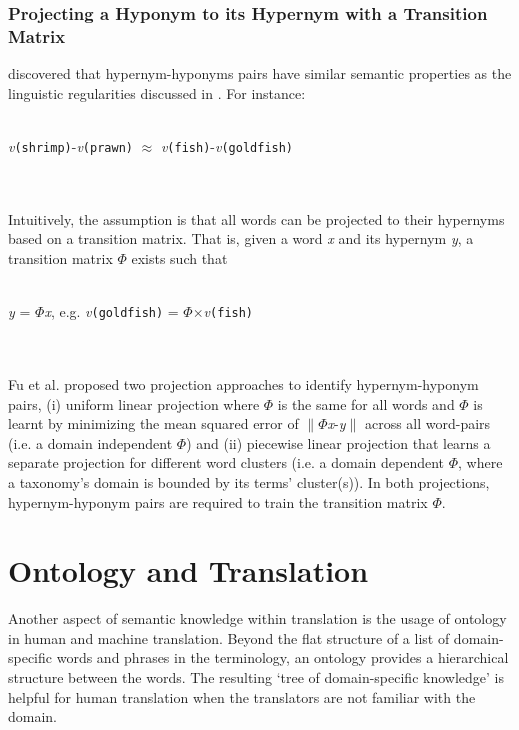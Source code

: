 \subsubsection{Projecting a Hyponym to its Hypernym with a Transition Matrix}
\citet{fu2014semhierarchies} discovered that hypernym-hyponyms pairs have similar semantic properties as the linguistic regularities discussed in \citet{mikolov2013}. For instance: 
\\ \\
\centerline{\emph{v}\texttt{(shrimp)}-\emph{v}\texttt{(prawn)} $\approx$ \emph{v}\texttt{(fish)}-\emph{v}\texttt{(goldfish)}}
\\ \\
\noindent Intuitively, the assumption is that all words can be projected to their hypernyms based on a transition matrix. That is, given a word \emph{x} and its hypernym \emph{y}, a transition matrix $\Phi$ exists such that 
\vspace{2mm}
\\ \\
\centerline{\emph{y} = $\Phi$\emph{x}, e.g. \emph{v}\texttt{(goldfish)} = $\Phi$$\times$\emph{v}\texttt{(fish)}}
\\ \\
\noindent Fu et al. proposed two projection approaches to identify hypernym-hyponym pairs, (i) uniform linear projection where $\Phi$ is the same for all words and $\Phi$ is learnt by minimizing the mean squared error of $\|$$\Phi$\emph{x}-\emph{y}$\|$ across all word-pairs (i.e. a domain independent $\Phi$) and (ii) piecewise linear projection that learns a separate projection for different word clusters (i.e. a domain dependent $\Phi$, where a taxonomy's domain is bounded by its terms' cluster(s)). In both projections, hypernym-hyponym pairs are required to train the transition matrix $\Phi$.

\section{Ontology and Translation}

Another aspect of semantic knowledge within translation is the usage of ontology in human and machine translation. Beyond the flat structure of a list of domain-specific words and phrases in the terminology, an ontology provides a hierarchical structure between the words. The resulting `tree of domain-specific knowledge' is helpful for human translation when the translators are not familiar with the domain. 

